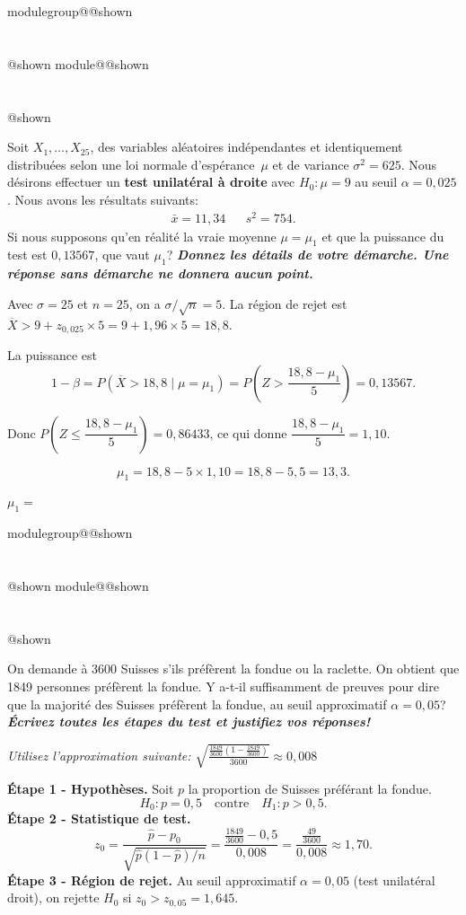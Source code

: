 \documentclass{Evaluation}
\makeatletter
\newcommand{\currentmodulekey}{}
\newcommand{\currentmoduletitle}{}
\newcommand{\currentgroupkey}{}
\newcommand{\currentgrouptitle}{}
\newcommand{\showmoduleifneeded}{%
  \ifx\currentgroupkey\empty\else
    \expandafter\ifx\csname modulegroup@\currentgroupkey @shown\endcsname\relax
      \section*{\currentgrouptitle}%
      \expandafter\gdef\csname modulegroup@\currentgroupkey @shown\endcsname{1}%
    \fi
  \fi
  \expandafter\ifx\csname module@\currentmodulekey @shown\endcsname\relax
    \section*{\currentmoduletitle}%
    \expandafter\gdef\csname module@\currentmodulekey @shown\endcsname{1}%
  \fi
}
\newenvironment{A23}{\showmoduleifneeded}{}
\makeatother
\begin{document}
\begin{questions}
\begin{A23}
\question {} %
Soit $X_1,\hdots, X_{25}$, des variables aléatoires indépendantes et identiquement distribuées selon une loi normale d'espérance~$\mu$ et de variance $\sigma^2=625$.
Nous désirons effectuer un \textbf{test unilatéral à droite} avec $H_0:\mu=9$ au seuil $\alpha = 0,025$.
Nous avons les résultats suivants:
\begin{align*}
    \bar{x}= 11,34 &  & s^2=754.
\end{align*}
Si nous supposons qu'en réalité la vraie moyenne $\mu=\mu_1$ et que la puissance du test est $0,13567$, que vaut $\mu_1$? 
\textbf{\textit{Donnez les détails de votre démarche. Une réponse sans démarche ne donnera aucun point.}}
\begin{solution}
Avec $\sigma=25$ et $n=25$, on a $\sigma/\sqrt{n}=5$.
La région de rejet est $\overline{X} > 9 + z_{0{,}025}\times 5 = 9 + 1{,}96\times 5 = 18{,}8$.

La puissance est
\[
1-\beta = P\!\left(\overline{X}>18{,}8\mid \mu=\mu_1\right)
= P\!\left(Z > \frac{18{,}8-\mu_1}{5}\right) = 0{,}13567.
\]

Donc $P\!\left(Z \leq \dfrac{18{,}8-\mu_1}{5}\right) = 0{,}86433$, ce qui donne
$\dfrac{18{,}8-\mu_1}{5} = 1{,}10$.

\[
\mu_1 = 18{,}8 - 5\times 1{,}10 = 18{,}8 - 5{,}5 = 13{,}3.
\]
\end{solution}

$\mu_1=$ 
\end{A23}

\begin{A23}
\question {} %
On demande à 3600 Suisses s'ils préfèrent la fondue ou la raclette. On obtient que 1849 personnes préfèrent la fondue. Y a-t-il suffisamment de preuves pour dire que la majorité des Suisses préfèrent la fondue, au seuil approximatif $\alpha = 0,05$? \textbf{\textit{Écrivez toutes les étapes du test et justifiez vos réponses!}}

\textit{Utilisez l'approximation suivante: $\displaystyle\sqrt{\frac{\frac{1849}{3600}\left(1-\frac{1849}{3600}\right)}{3600}}\approx0,008$}
\begin{solution}
\textbf{Étape 1 - Hypothèses.} Soit $p$ la proportion de Suisses préférant la fondue.
\[
H_0: p=0{,}5 \quad \text{contre} \quad H_1: p > 0{,}5.
\]
\textbf{Étape 2 - Statistique de test.}
\[
z_0 = \frac{\hat{p}-p_0}{\sqrt{\hat{p}(1-\hat{p})/n}}
= \frac{\frac{1849}{3600}-0{,}5}{0{,}008}
= \frac{\frac{49}{3600}}{0{,}008} \approx 1{,}70.
\]
\textbf{Étape 3 - Région de rejet.} Au seuil approximatif $\alpha=0{,}05$ (test unilatéral droit), on rejette $H_0$ si $z_0 > z_{0{,}05} = 1{,}645$.


\end{solution}
\end{A23}
\end{questions}
\end{document}
